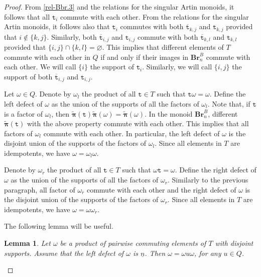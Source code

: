 \documentclass[a4paper]{amsart}
\newtheorem{lemma}[theorem]{Lemma}
\begin{document}
\begin{proof}
From \eqref{rel-Bbr.3} and the relations for
the singular Artin monoids, it follows that all $\mathtt{t}_i$ 
commute with each other. From the relations for
the singular Artin monoids, it follows also that 
$\mathtt{t}_i$ commutes with both $\overline{\mathtt{t}}_{k,j}$
and ${\mathtt{t}}_{k,j}$ provided that $i\not\in \{k,j\}$.
Similarly, both $\overline{\mathtt{t}}_{i,j}$
and $\mathtt{t}_{i,j}$ commute with both 
$\overline{\mathtt{t}}_{k,l}$ and ${\mathtt{t}}_{k,l}$
provided that $\{i,j\}\cap\{k,l\}=\varnothing$.
This implies that different elements of $T$ commute with
each other in $Q$ if and only if their images in
$\mathbf{Br}_n^B$ commute with each other.
We will call $\{i\}$ the support of $\mathtt{t}_{i}$. Similarly,
we will call $\{i,j\}$ the support of both $\overline{\mathtt{t}}_{i,j}$
and $\mathtt{t}_{i,j}$.


Let $\omega\in Q$. Denote by $\omega_l$ the product of all
$\mathtt{t}\in T$ such that $\mathtt{t}\omega=\omega$.
Define the left defect of $\omega$ as the union of 
the supports of all the factors of $\omega_l$.
Note that, if $\mathtt{t}$ is a factor of $\omega_l$,
then $\tilde{\boldsymbol{\pi}}(\mathtt{t})
\tilde{\boldsymbol{\pi}}(\omega)=\tilde{\boldsymbol{\pi}}(\omega)$.
In the monoid $\mathbf{Br}_n^B$, different 
$\tilde{\boldsymbol{\pi}}(\mathtt{t})$ with the above property
commute with each other. This implies that all 
factors of $\omega_l$ commute with each other.
In particular, the left defect of $\omega$ is the disjoint
union of the supports of the factors of $\omega_l$.
Since all elements in $T$ are idempotents, we have
$\omega=\omega_l\omega$.

Denote by $\omega_r$ the product of all
$\mathtt{t}\in T$ such that $\omega\mathtt{t}=\omega$.
Define the right defect of $\omega$ as the union of 
the supports of all the factors of $\omega_r$.
Similarly to the previous paragraph, all 
factor of $\omega_r$ commute with each other
and the right defect of $\omega$ is the disjoint
union of the supports of the factors of $\omega_r$.
Since all elements in $T$ are idempotents, we have
$\omega=\omega\omega_r$.

The following lemma will be useful.

\begin{lemma}\label{lem-n120}
Let $\omega$ be a product of pairwise commuting elements of
$T$ with disjoint supports. Assume that the left defect of
$\omega$ is $\underline{n}$. Then $\omega=\omega u\omega$,
for any $u\in Q$.
\end{lemma}


\end{proof}
\end{document}
